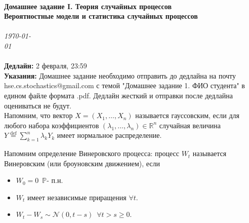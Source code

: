 \documentclass[12pt]{article}
\renewcommand{\=}[1]{\stackrel{#1}{=}} %
\begin{document}
{\noindent\Large\bf  \\[0.5\baselineskip] {\selectfont  Домашнее задание I. Теория случайных процессов}         }\\[2\baselineskip] %
{ {\bf {}\selectfont Вероятностные модели и статистика случайных процессов}\\
\vspace{0.3cm}
\\
{\textit{\selectfont     \today}}}~~~~~~~~~~~~~~~~~~~~~~~~~~~~~~~~~~~~~~~~~~~~~~~~~~~~~~~~~~~~~~~~~~~~~~~~~~~~~    {\large \textsc{}} %
\\[1.4\baselineskip]
\textbf{Дедлайн:} 2 февраля, 23:59\vspace{0.3cm}\\ 
\textbf{Указания:} Домашнее задание необходимо отправить до дедлайна на почту hse.cs.stochastics@gmail.com с темой "Домашнее задание 1. ФИО студента" в едином файле формата .pdf. Дедлайн жесткий и отправки после дедлайна оцениваться не будут.
\vspace{1cm} \\
Напомним, что вектор $X= (X_1, \dots, X_n)$ называется гауссовским, если для любого набора коэффициентов $(\lambda_1, \dots, \lambda_n) \in \mathbb{R}^n$ случайная величина $Y \stackrel{\text{def}}{=} \sum_{k=1}^n \lambda_k Y_k$ имеет нормальное распределение. 
\par Напомним определение Винеровского процесса: процесс $W_t$ называется Винеровским (или броуновским движением), если 
\begin{itemize}
    \item $W_0 = 0 \,\,\, \mathbb{P}$- п.н.
    \item $W_t$ имеет независимые приращения $\forall t$.
    \item $W_t - W_s \sim \mathcal{N}(0, t- s) \,\,\, \forall t > s \ge 0$.
\end{itemize}
\end{document}
